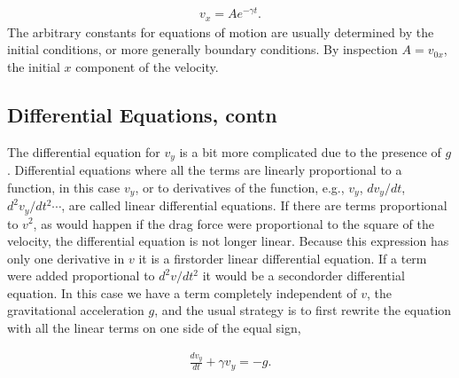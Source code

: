 \documentclass[letterpaper,10pt,english]{sphinxmanual}
\begin{document}
\begin{equation*}
\begin{split}
\begin{equation}
v_x=Ae^{-\gamma t}.
\label{_auto5} \tag{5}
\end{equation}
\end{split}
\end{equation*}
The arbitrary constants for equations of motion are usually determined
by the initial conditions, or more generally boundary conditions. By
inspection \(A=v_{0x}\), the initial \(x\) component of the velocity.


\subsection{Differential Equations, contn}
\label{\detokenize{chapter3:differential-equations-contn}}
The differential equation for \(v_y\) is a bit more complicated due to
the presence of \(g\). Differential equations where all the terms are
linearly proportional to a function, in this case \(v_y\), or to
derivatives of the function, e.g., \(v_y\), \(dv_y/dt\),
\(d^2v_y/dt^2\cdots\), are called linear differential equations. If
there are terms proportional to \(v^2\), as would happen if the drag
force were proportional to the square of the velocity, the
differential equation is not longer linear. Because this expression
has only one derivative in \(v\) it is a first\sphinxhyphen{}order linear differential
equation. If a term were added proportional to \(d^2v/dt^2\) it would be
a second\sphinxhyphen{}order differential equation.  In this case we have a term
completely independent of \(v\), the gravitational acceleration \(g\), and
the usual strategy is to first rewrite the equation with all the
linear terms on one side of the equal sign,




\begin{equation*}
\begin{split}
\begin{equation}
\frac{dv_y}{dt}+\gamma v_y=-g.
\label{_auto6} \tag{6}
\end{equation}
\end{split}
\end{equation*}
\end{document}
